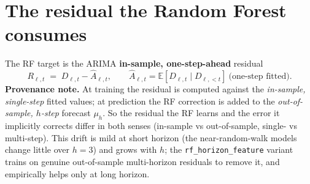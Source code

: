 \documentclass[11pt]{article}
\newcommand{\code}[1]{\texttt{\small #1}}
\begin{document}
\section{The residual the Random Forest consumes}
The RF target is the ARIMA \textbf{in-sample, one-step-ahead} residual
\[
R_{\ell,t} \;=\; D_{\ell,t}-\hat A_{\ell,t},\qquad
\hat A_{\ell,t}=\mathbb{E}[D_{\ell,t}\mid D_{\ell,<t}]\ \text{(one-step fitted)} .
\]
\textbf{Provenance note.} At training the residual is computed against the \emph{in-sample,
single-step} fitted values; at prediction the RF correction is added to the
\emph{out-of-sample, $h$-step} forecast $\mu_h$. So the residual the RF learns and the error
it implicitly corrects differ in both senses (in-sample vs out-of-sample, single- vs
multi-step). This drift is mild at short horizon (the near-random-walk models change little
over $h{=}3$) and grows with $h$; the \code{rf\_horizon\_feature} variant trains on genuine
out-of-sample multi-horizon residuals to remove it, and empirically helps only at long horizon.
\end{document}
